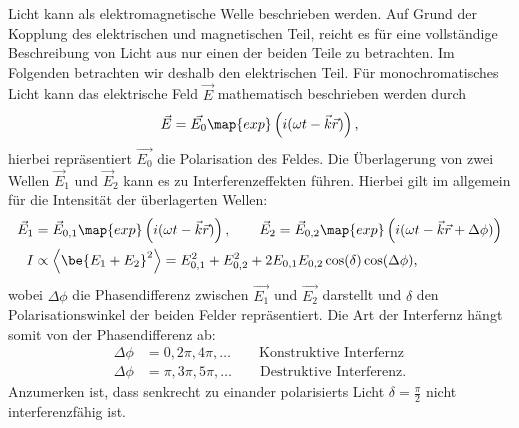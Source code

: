 Licht kann als elektromagnetische Welle beschrieben werden.
Auf Grund der Kopplung des elektrischen und magnetischen Teil, reicht
es für eine vollständige Beschreibung von Licht aus nur einen der beiden Teile zu betrachten.
Im Folgenden betrachten wir deshalb den elektrischen Teil.
Für monochromatisches Licht kann das elektrische Feld $\vec{E}$ mathematisch beschrieben
werden durch
\begin{equation*}
  \vec{E} = \vec{E_0} \map{exp}\left(i (\omega t-\vec{k}\vec{r})\right),
\end{equation*}
hierbei repräsentiert $\vec{E_0}$ die Polarisation des Feldes.
Die Überlagerung von zwei Wellen $\vec{E}_1$ und $\vec{E}_2$ kann es zu Interferenzeffekten führen.
Hierbei gilt im allgemein für die Intensität der überlagerten Wellen:
\begin{align}
  \label{eq:Interferenz_enstehung}
  \begin{aligned}
  \vec{E}_1&=\vec{E}_{0,1} \map{exp}\left(i (\omega t-\vec{k}\vec{r})\right), \qquad \vec{E}_2 =\vec{E}_{0,2} \map{exp}\left(i (\omega t-\vec{k}\vec{r}+\Delta\phi)\right) \\
  I &\propto \left<\be{E_1+E_2}^2\right> = E_{0,1}^2 + E_{0,2}^2 + 2E_{0,1}E_{0,2}\cos(\delta)\cos(\Delta\phi),
\end{aligned}
\end{align}
wobei $\Delta\phi$ die Phasendifferenz zwischen $\vec{E_1}$ und $\vec{E_2}$ darstellt und
$\delta$ den Polarisationswinkel der beiden Felder repräsentiert.
Die Art der Interfernz hängt somit von der Phasendifferenz ab:
\begin{align}
  \Delta\phi &=0,2\pi,4\pi,\dots \qquad \text{Konstruktive Interfernz} \label{eq:Konstruktive}\\
  \Delta\phi &= \pi, 3\pi, 5\pi,\dots \qquad \text{Destruktive Interferenz}. \label{eq:Destruktive}
\end{align}
Anzumerken ist, dass senkrecht zu einander polarisierts Licht $\delta=\frac{\pi}{2}$ nicht
interferenzfähig ist.
